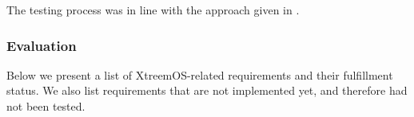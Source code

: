 The testing process was in line with the approach given in .





\subsubsection{Evaluation}



Below we present a list of XtreemOS-related requirements and their fulfillment status. 
We also list requirements that are not implemented yet, and therefore had not been tested.


